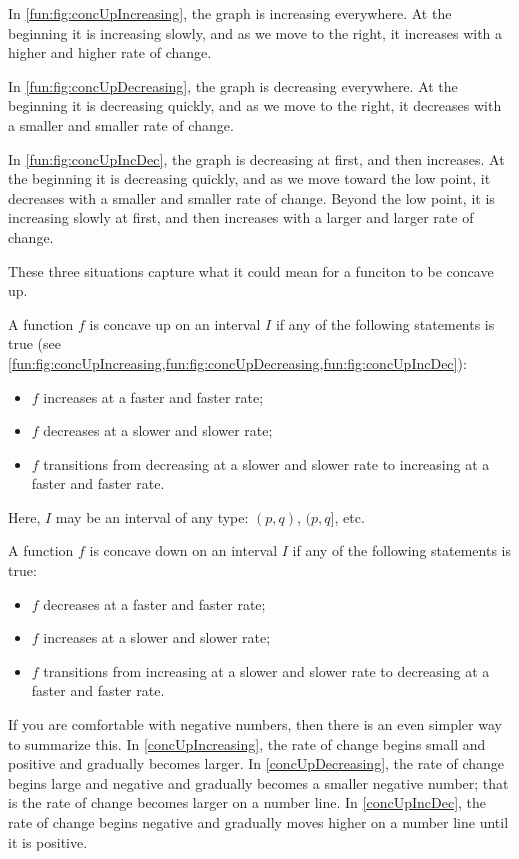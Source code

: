 In \cref{fun:fig:concUpIncreasing}, the graph is increasing everywhere. At the beginning it is increasing slowly, and as we move to the right, it increases with a higher and higher rate of change.

In \cref{fun:fig:concUpDecreasing}, the graph is decreasing everywhere. At the beginning it is decreasing quickly, and as we move to the right, it decreases with a smaller and smaller rate of change.

In \cref{fun:fig:concUpIncDec}, the graph is decreasing at first, and then increases. At the beginning it is decreasing quickly, and as we move toward the low point, it decreases with a smaller and smaller rate of change. Beyond the low point, it is increasing slowly at first, and then increases with a larger and larger rate of change. 

These three situations capture what it could mean for a funciton to be concave up.

\begin{pccspecialcomment}
A function $f$ is concave up on an interval $I$ if any of the following statements is true (see \cref{fun:fig:concUpIncreasing,fun:fig:concUpDecreasing,fun:fig:concUpIncDec}):
\begin{itemize}
	\item $f$ increases at a faster and faster rate; 
	\item $f$ decreases at a slower and slower rate;
	\item $f$ transitions from decreasing at a slower and slower rate to increasing at a faster and faster rate.
\end{itemize}

Here, $I$ may be an interval of any type: $(p, q)$, $(p, q]$, etc.

A function $f$ is concave down on an interval $I$ if any of the following statements is true:
\begin{itemize}
	\item $f$ decreases at a faster and faster rate;
	\item $f$ increases at a slower and slower rate;
	\item $f$ transitions from increasing at a slower and slower rate to decreasing at a faster and faster rate.
\end{itemize}
\end{pccspecialcomment}

If you are comfortable with negative numbers, then there is an even simpler way to summarize this. In \cref{concUpIncreasing}, the rate of change begins small and positive and gradually becomes larger. In \cref{concUpDecreasing}, the rate of change begins large and negative and gradually becomes a smaller negative number; that is the rate of change becomes larger on a number line. In \cref{concUpIncDec}, the rate of change begins negative and gradually moves higher on a number line until it is positive.

